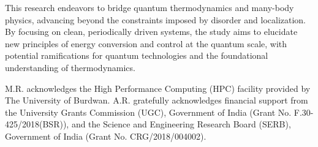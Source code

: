 \documentclass[%
reprint,
superscriptaddress,
amsmath,amssymb,
aps,
prb,
showkeys,
]{revtex4-2}
\begin{document}
This research endeavors to bridge quantum thermodynamics and many-body physics, advancing beyond the constraints imposed by disorder and localization. By focusing on clean, periodically driven systems, the study aims to elucidate new principles of energy conversion and control at the quantum scale, with potential ramifications for quantum technologies and the foundational understanding of thermodynamics.

\begin{acknowledgments}
M.R. acknowledges the High Performance Computing (HPC) facility provided by The University of Burdwan. A.R. gratefully acknowledges financial support from the University Grants Commission (UGC), Government of India (Grant No. F.30-425/2018(BSR)), and the Science and Engineering Research Board (SERB), Government of India (Grant No. CRG/2018/004002). %
\end{acknowledgments}

\appendix




\end{document}
